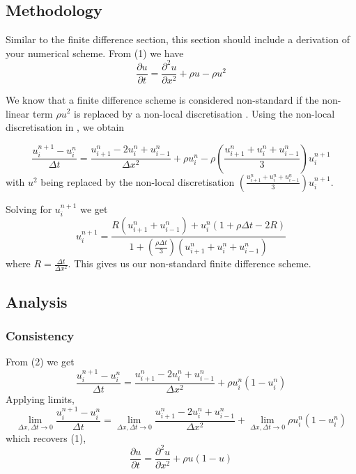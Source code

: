 \documentclass[a4paper]{article}
\begin{document}
	\subsection{Methodology}\label{sec:Altmethods}
		Similar to the finite difference section, this section should include a derivation of your numerical scheme.
		\newline 
		\newline
		From (1) we have
		\begin{equation*}
		    \frac{\partial u}{\partial t} = \frac{\partial^2 u}{\partial x^2} + \rho u- \rho u^2
		\end{equation*}
		
		
		We know that a finite difference scheme is considered non-standard if the non-linear term $\rho u^2$ is replaced by a non-local discretisation \cite{anguelov}. 
		Using the non-local discretisation in \cite{mickens}, we obtain 

		\begin{equation}
		   \frac{u_i^{n+1} -u_i^{n} }{\Delta t} = \frac{u_{i+1}^n - 2u_i^n + u_{i-1}^n }{\Delta x^2}+\rho u_i^n-\rho (\frac{u_{i+1}^n + u_i^n + u_{i-1}^n}{3})u_i^{n+1}
		\end{equation}
		with $u^2$ being replaced by the non-local discretisation $(\frac{u_{i+1}^n + u_i^n + u_{i-1}^n}{3})u_i^{n+1}$.
		
		Solving for $u_i^{n+1}$ we get
        \begin{equation}
		    u_i^{n+1} = \frac{R(u_{i+1}^n + u_{i-1}^n) + u_i^n(1+\rho \Delta t -2R)}{1+(\frac{\rho \Delta t}{3})(u_{i+1}^n + u_i^n + u_{i-1}^n)}
		\end{equation}
		where $R=\frac{\Delta t}{\Delta x^2}$. This gives us our non-standard finite difference scheme.
		
	\subsection{Analysis}\label{sec:Altanalysis}
		\subsubsection{Consistency}
		
		From (2) we get
		\begin{equation*}
		   \frac{u_i^{n+1} -u_i^{n} }{\Delta t} = \frac{u_{i+1}^n - 2u_i^n + u_{i-1}^n }{\Delta x^2}+\rho u_i^n(1-u_i^n)
		\end{equation*}
		Applying limits,
        \begin{equation*}
		   \lim_{\Delta x, \Delta t\rightarrow 0}\frac{u_i^{n+1} -u_i^{n} }{\Delta t} = \lim_{\Delta x, \Delta t\rightarrow 0} \frac{u_{i+1}^n - 2u_i^n + u_{i-1}^n }{\Delta x^2}+\lim_{\Delta x, \Delta t\rightarrow 0} \rho u_i^n(1-u_i^n)
		\end{equation*}
		which recovers (1),
		\begin{equation*}
		    \frac{\partial u}{\partial t} = \frac{\partial^2 u}{\partial x^2} + \rho u(1-u)
		\end{equation*}
\end{document}

